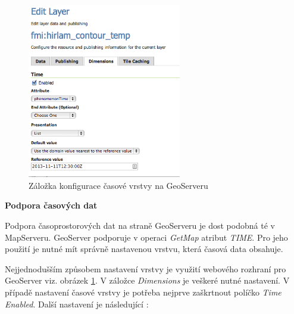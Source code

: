 \begin{figure}[h!]  \centering
\includegraphics[width=0.6\textwidth]{../img/geoserver-layer-edit.png}
	\caption{Záložka konfigurace časové vrstvy na GeoServeru
\cite{geoserver-layer-edit}}
	\label{fig:geoserver-layer-edit}
\end{figure}

\bigskip
\noindent

\textbf{Podpora časových dat}

Podpora časoprostorových dat na straně GeoServeru je dost podobná té v
MapServeru. GeoServer podporuje v operaci \textit{GetMap} atribut
\textit{TIME}. Pro jeho použití je nutné mít správně nastavenou
vrstvu, která časová data obsahuje.

Nejjednodušším způsobem nastavení vrstvy je využití webového rozhraní
pro Geo\-Server viz. obrázek \ref{fig:geoserver-layer-edit}. V záložce \textit{Dimensions} je veškeré
nutné nastavení. V případě nastavení časové vrstvy je potřeba nejprve
zaškrtnout políčko \textit{Time Enabled}. Další nastavení je
následující \cite{geoserver-layer-edit}:

